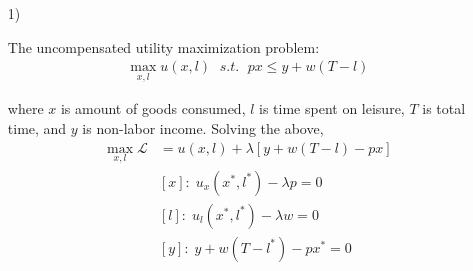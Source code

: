 \documentclass[
]{article}
\begin{document}
\begin{enumerate}  
\item[1)]  

The uncompensated utility maximization problem: 
\[\begin{aligned}
\max_{x, l} u(x, l) \; \textit{ s.t. } \;px \leq y + w(T-l)
\end{aligned}\]

where $x$ is amount of goods consumed, $l$ is time spent on leisure, $T$ is total time, and $y$ is non-labor income.  
Solving the above,
\[\begin{aligned}
\max_{x, l} \mathcal{L} &= u(x, l) + \lambda [y + w(T-l) -px] \\
&[x]:\;u_x(x^*,l^*) - \lambda p = 0 \\
&[l]:\;u_l(x^*,l^*) - \lambda w = 0 \\
&[y]:\;y + w(T-l^*) -px^* = 0
\end{aligned}\]


\end{enumerate}
\end{document}
